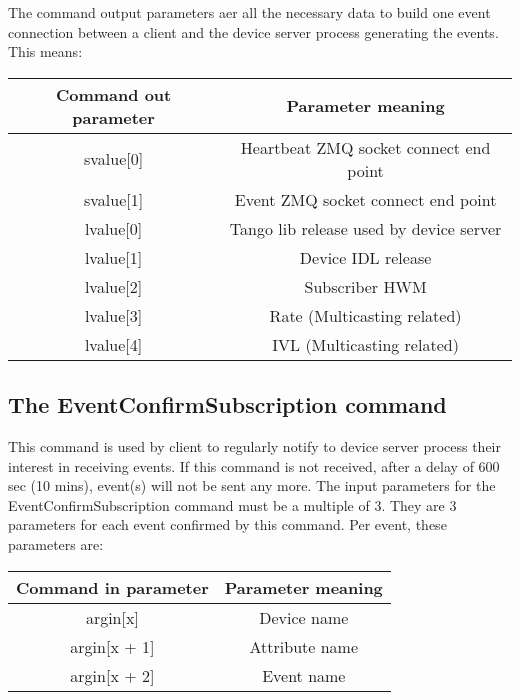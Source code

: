 \vspace{0.3cm}


The command output parameters aer all the necessary data to build
one event connection between a client and the device server process
generating the events. This means:\vspace{0.3cm}


\begin{center}
\begin{longtable}{|c|c|}
\hline 
Command out parameter & Parameter meaning\tabularnewline
\hline 
\hline 
svalue{[}0{]} & Heartbeat ZMQ socket connect end point\tabularnewline
\hline 
svalue{[}1{]} & Event ZMQ socket connect end point\tabularnewline
\hline 
lvalue{[}0{]} & Tango lib release used by device server\tabularnewline
\hline 
lvalue{[}1{]} & Device IDL release\tabularnewline
\hline 
lvalue{[}2{]} & Subscriber HWM\tabularnewline
\hline 
lvalue{[}3{]} & Rate (Multicasting related)\tabularnewline
\hline 
lvalue{[}4{]} & IVL (Multicasting related)\tabularnewline
\hline 
\end{longtable}
\par\end{center}

\vspace{0.3cm}



\subsection{The EventConfirmSubscription command}

This command is used by client to regularly notify to device server
process their interest in receiving events. If this command is not
received, after a delay of 600 sec (10 mins), event(s) will not be
sent any more. The input parameters for the EventConfirmSubscription
command must be a multiple of 3. They are 3 parameters for each event
confirmed by this command. Per event, these parameters are:

\vspace{0.3cm}


\begin{center}
\begin{longtable}{|c|c|}
\hline 
Command in parameter & Parameter meaning\tabularnewline
\hline 
\hline 
argin{[}x{]} & Device name\tabularnewline
\hline 
argin{[}x + 1{]} & Attribute name\tabularnewline
\hline 
argin{[}x + 2{]} & Event name\tabularnewline
\hline 
\end{longtable}
\par\end{center}


